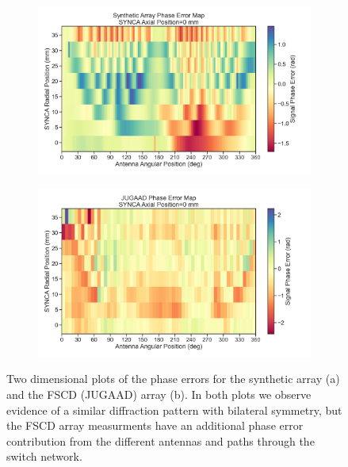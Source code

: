 \begin{figure}[h]
\centering
\begin{subfigure}{.6\textwidth}
  \centering
  \includegraphics[width=1\textwidth]{figs/Chapter-5/230120_synth_array_phase_error_map_z0.png}
  \caption{}
  \label{fig:jugaad_phase_map}
\end{subfigure}
\par\medskip %
\begin{subfigure}{.6\textwidth}
  \centering
  \includegraphics[width=1\textwidth]{figs/Chapter-5/230123_jugaad_phase_error_map_z0.png}
  \caption{}
  \label{fig:synth_jugaad_phase_map}
\end{subfigure}
\caption{Two dimensional plots of the phase errors for the synthetic array (a) and the FSCD (JUGAAD) array (b). In both plots we observe evidence of a similar diffraction pattern with bilateral symmetry, but the FSCD array measurments have an additional phase error contribution from the different antennas and paths through the switch network.}
\label{fig:jugaad_measured_phase_maps}
\end{figure}

